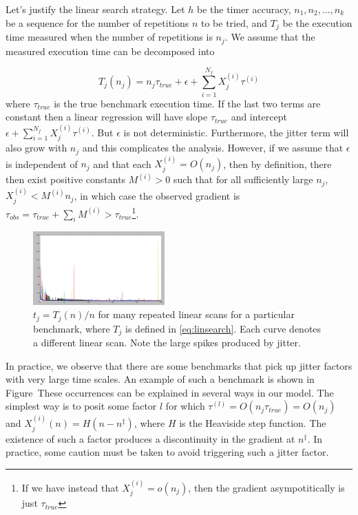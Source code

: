\documentclass[conference]{IEEEtran}
\begin{document}
Let's justify the linear search strategy. Let $h$ be the timer accuracy, $n_1, n_2, ..., n_k$ be a sequence for the number of repetitions $n$ to be tried, and $T_j$ be the execution time measured when the number of repetitions is $n_j$. We assume that the measured execution time can be decomposed into

\begin{equation}
    \label{eq:linsearch}
    T_j(n_j) = n_j \tau_{true} + \epsilon + \sum_{i=1}^{N_f} X_j^{(i)} \tau^{(i)}
\end{equation}
%
where $\tau_{true}$ is the true benchmark execution time. If the last two terms
are constant then a linear regression will have slope $\tau_{true}$ and intercept $\epsilon + \sum_{i=1}^{N_f} X_j^{(i)} \tau^{(i)}$. But $\epsilon$ is not deterministic. Furthermore, the jitter term will also grow with $n_j$ and this complicates the analysis.
However, if we assume that $\epsilon$ is independent of $n_j$ and that each $X_j^{(i)} = O(n_j)$, then by definition, there then exist positive constants $M^{(i)} > 0$ such that for all sufficiently large $n_j$, $X_j^{(i)} < M^{(i)} n_j$, in which case the observed gradient is $\tau_{obs} = \tau_{true} + \sum_i M^{(i)} > \tau_{true}$\footnote{If we have instead that $X_j^{(i)} = o(n_j)$, then the gradient asympotitically is just $\tau_{true}$}.

\begin{figure}
\centering
\includegraphics[width=0.45\textwidth]{experiments/images/fmanytrials_wide}
\caption{$t_j = T_j(n)/n$ for many repeated linear scans for a particular benchmark, where $T_j$ is defined in \eqref{eq:linsearch}. Each curve denotes a different linear scan. Note the large spikes produced by jitter.}
\label{fig:scaling}
\end{figure}

In practice, we observe that there are some benchmarks that pick up jitter factors with very large time scales. An example of such a benchmark is shown in Figure~These occurrences can be explained in several ways in our model. The simplest way is to posit some factor $l$ for which $\tau^{(l)} = O(n_j \tau_{true}) = O(n_j)$ and $X_j^{(i)}(n) = H(n - n^\ddagger)$,
where $H$ is the Heaviside step function. The existence of such a factor produces a discontinuity in the gradient at $n^\ddagger$. In practice, some caution must be taken to avoid triggering such a jitter factor.
\end{document}
